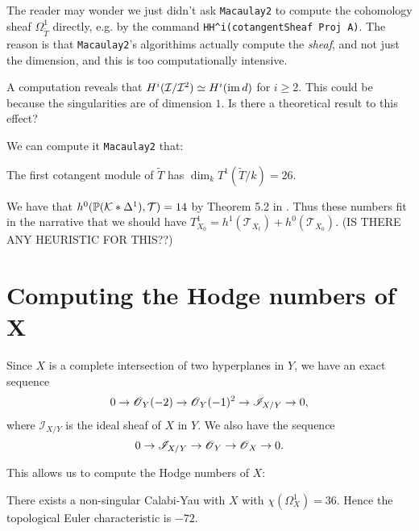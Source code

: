 \documentclass[11pt, english]{article}
\begin{document}
\begin{remark}
 The reader may wonder we just didn't ask \verb|Macaulay2| to compute the cohomology sheaf $\Omega_{\widetilde T}^1$ directly, e.g. by the command \verb|HH^i(cotangentSheaf Proj A)|. The reason is that \verb|Macaulay2|'s algorithims actually compute the \emph{sheaf}, and not just the dimension, and this is too computationally intensive.
\end{remark}

\begin{remark}[Question]
A computation reveals that $H^i(\mathcal I/\mathcal I^2) \simeq H^i(\operatorname{im} d)$ for $ i\geq 2$. This could be because the singularities are of dimension $1$. Is there a theoretical result to this effect?
\end{remark}

We can compute it \verb|Macaulay2| that:
\begin{lemma}
The first cotangent module of $\widetilde T$ has $\dim_k T^1(\widetilde T/k) = 26$. 
\end{lemma}

We have that $h^0(\mathbb{P}(\mathcal K \ast \Delta^1),\mathcal T)=14$ by Theorem 5.2 in \cite{deforming_christophersen}. Thus these numbers fit in the narrative that we should have $T^1_{X_0} = h^1(\mathcal T_{X_t}) + h^0(\mathcal T_{X_0})$. (IS THERE ANY HEURISTIC FOR THIS??)

\section{Computing the Hodge numbers of X}

Since $X$ is a complete intersection of two hyperplanes in $Y$, we have an exact sequence
\[
0 \to \operatorname{\mathscr{O}}_Y(-2) \to \operatorname{\mathscr{O}}_Y(-1)^2 \to \mathscr I_{X/Y} \to 0,
\]
where $\mathscr I_{X/Y}$ is the ideal sheaf of $X$ in $Y$. We also have the sequence
\begin{equation}
\label{eqox}
0 \to \mathscr I_{X/Y} \to \operatorname{\mathscr{O}}_Y \to \operatorname{\mathscr{O}}_X \to 0.  
\end{equation}

This allows us to compute the Hodge numbers of $X$:

\begin{thm}
There exists a non-singular Calabi-Yau with $X$ with $\chi(\Omega_X^1)=36$. Hence the topological Euler characteristic is $-72$.
\end{thm}
\end{document}
